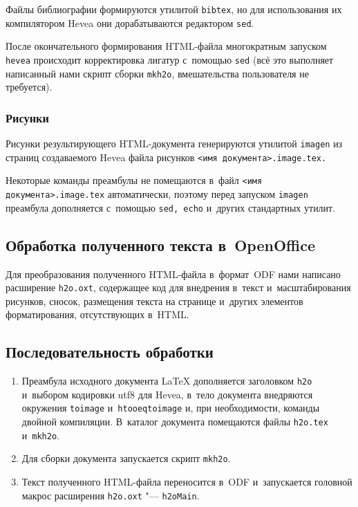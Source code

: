 \documentclass[10pt, a5paper]{article}
\begin{document}
Файлы библиографии %
формируются утилитой \verb!bibtex!, но для использования их компилятором Hevea они дорабатываются редактором \texttt{sed}.

После окончательного формирования HTML-файла многократным запуском \texttt{hevea} происходит корректировка лигатур с~помощью \texttt{sed}
(всё это выполняет написанный нами скрипт сборки \texttt{mkh2o}, вмешательства пользователя не требуется).

\subsubsection*{Рисунки}
Рисунки результирующего HTML-документа генерируются утилитой \texttt{imagen} из страниц создаваемого Hevea файла рисунков \texttt{<имя документа>.image.tex.}

Некоторые команды преамбулы не помещаются в~файл \texttt{<имя документа>.image.tex} автоматически, поэтому перед запуском \linebreak \texttt{imagen} преамбула дополняется с~помощью \texttt{sed, echo} и~других стандартных утилит.


\subsection*{Обработка полученного текста в~OpenOffice}

Для преобразования полученного HTML-файла в~формат~ODF нами написано расширение \texttt{h2o.oxt},
содержащее код для внедрения в~текст и~масштабирования рисунков, сносок, размещения текста на странице и~других элементов форматирования, отсутствующих в~HTML.

\subsection*{Последовательность обработки}

\begin{enumerate}
\item Преамбула исходного документа \LaTeX{} дополняется заголовком \texttt{h2o} и~выбором кодировки utf8 для Hevea,
в~тело документа внедряются окружения \texttt{toimage} и~\texttt{htooeqtoimage} и, при необходимости, команды двойной компиляции.
В~каталог документа помещаются файлы  \texttt{h2o.tex} и~\texttt{mkh2o}.

\item Для сборки документа запускается скрипт \texttt{mkh2o}.

\item Текст полученного HTML-файла переносится в~ODF и~запускается головной макрос расширения \texttt{h2o.oxt} "--- \texttt{h2oMain}.
\end{enumerate}
\end{document}
